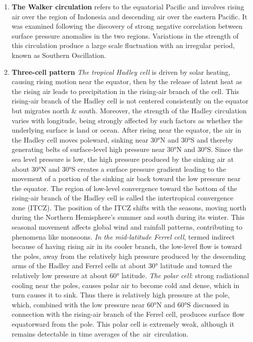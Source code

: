 \begin{enumerate}
	\item  \textbf{The Walker circulation} refers to the equatorial Pacific and involves rising air over the region of Indonesia and descending air over the eastern Pacific. It was examined following the discovery of strong negative correlation between surface pressure anomalies in the two regions.
	      Variations in the strength of this circulation produce a large scale fluctuation with an irregular period, known as Southern Oscillation.

	\item \textbf{Three-cell pattern}
	      \newline \textit{The tropical Hadley cell} is driven by solar heating, causing rising motion near the equator, then by the release of latent heat as the rising air leads to precipitation in the rising-air branch of the cell. This rising-air branch of the Hadley cell is not centered consistently on the equator but migrates north \& south.
	      Moreover, the strength of the Hadley circulation varies with longitude, being strongly affected by such factors as whether the underlying surface is land or ocean. After rising near the equator, the air in the Hadley cell moves poleward, sinking near 30°N and 30°S and thereby generating belts of surface-level high pressure near 30°N and 30°S. Since the sea level pressure is low, the high pressure produced by the sinking air at about 30°N and 30°S creates a surface pressure gradient leading to the movement of a portion of the sinking air back toward the low pressure near the equator. The region of low-level convergence toward the bottom of the rising-air branch of the Hadley cell is called the intertropical convergence zone (ITCZ). The position of the ITCZ shifts with the seasons, moving north during the Northern Hemisphere’s summer and south during its winter. This seasonal movement affects global wind and rainfall patterns, contributing to phenomena like monsoons.
	      \newline\textit{In the mid-latitude Ferrel cell}, termed indirect because of having rising air in its cooler branch, the low-level flow is toward the poles, away from the relatively high pressure produced by the descending arms of the Hadley and Ferrel cells at about 30° latitude and toward the relatively low pressure at about 60° latitude.
	      \newline \textit{The polar cell}: strong radiational cooling near the poles, causes polar air to become cold and dense, which in turn causes it to sink. Thus there is relatively high pressure at the pole, which, combined with the low pressure near 60°N and 60°S discussed in connection with the rising-air branch of the Ferrel cell, produces surface flow equatorward from the pole. This polar cell is extremely weak, although it remains detectable in time averages of the air circulation.

\end{enumerate}

